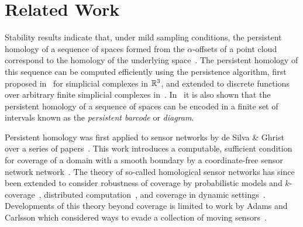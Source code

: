 
\section{Related Work}
\label{sec:related}

Stability results indicate that, under mild sampling conditions, the persistent homology of a sequence of spaces formed from the $\alpha$-offsets of a point cloud correspond to the homology of the underlying space~\cite{cohensteiner07stability}.
The persistent homology of this sequence can be computed efficiently using the persistence algorithm, first proposed in~\cite{edelsbrunner02simplification} for simplicial complexes in $\mathbb{R}^3$, and extended to discrete functions over arbitrary finite simplicial complexes in~\cite{zomorodian05computing}.
In~\cite{zomorodian05computing} it is also shown that the persistent homology of a sequence of spaces can be encoded in a finite set of intervals known as the \emph{persistent barcode} or \emph{diagram}.


Persistent homology was first applied to sensor networks by de Silva \& Ghrist over a series of papers~\cite{ghrist05coverage,desilva06coordinate,desilva07homological,desilva07coverage}.
This work introduces a computable, sufficient condition for coverage of a domain with a smooth boundary by a coordinate-free sensor network network~\cite{desilva07coverage}.
The theory of so-called homological sensor networks has since been extended to consider robustness of coverage by probabilistic models and $k$-coverage~\cite{munch12failure,cavanna2017when}, distributed computation~\cite{dlotko12distributed}, and coverage in dynamic settings~\cite{gamble12applied,gamble14coordinate}.
Developments of this theory  beyond coverage is limited to work by Adams and Carlsson which considered ways to evade a collection of moving sensors~\cite{adams13evasion}.

